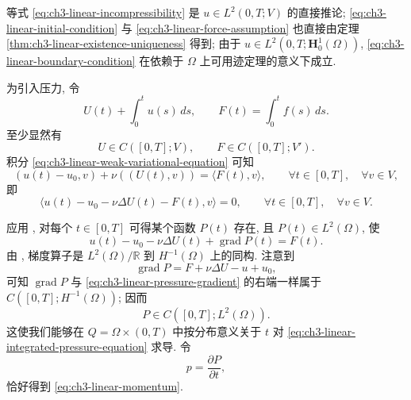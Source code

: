 \begin{Proof}
等式 \eqref{eq:ch3-linear-incompressibility} 是 $u\in L^2(0,T;V)$ 的直接推论; \eqref{eq:ch3-linear-initial-condition} 与 \eqref{eq:ch3-linear-force-assumption} 也直接由定理 \ref{thm:ch3-linear-existence-uniqueness} 得到; 由于 $u\in L^2(0,T;\mathbf H_0^1(\Omega))$, \eqref{eq:ch3-linear-boundary-condition} 在依赖于 $\Omega$ 上可用迹定理的意义下成立.

为引入压力, 令
\begin{equation}
U(t)+\int_0^t u(s)\,ds,
\qquad
F(t)=\int_0^t f(s)\,ds.
\label{eq:ch3-linear-integrated-velocity-force}
\end{equation}
至少显然有
\[
U\in C([0,T];V),
\qquad F\in C([0,T];V').
\]
积分 \eqref{eq:ch3-linear-weak-variational-equation} 可知
\begin{equation}
(u(t)-u_0,v)+\nu((U(t),v))
=\langle F(t),v\rangle,
\qquad\forall t\in[0,T],\quad\forall v\in V,
\label{eq:ch3-linear-integrated-variational-equation}
\end{equation}
即
\[
\langle u(t)-u_0-\nu\Delta U(t)-F(t),v\rangle=0,
\qquad\forall t\in[0,T],\quad\forall v\in V.
\]

\hypertarget{chapter-03-page-196}{}
应用 , 对每个 $t\in[0,T]$ 可得某个函数 $P(t)$ 存在, 且 $P(t)\in L^2(\Omega)$, 使
\begin{equation}
u(t)-u_0-\nu\Delta U(t)+\operatorname{grad}P(t)=F(t).
\label{eq:ch3-linear-integrated-pressure-equation}
\end{equation}
由 , 梯度算子是 $L^2(\Omega)/\mathbb R$ 到 $H^{-1}(\Omega)$ 上的同构. 注意到
\begin{equation}
\operatorname{grad}P=F+\nu\Delta U-u+u_0,
\label{eq:ch3-linear-pressure-gradient}
\end{equation}
可知 $\operatorname{grad}P$ 与 \eqref{eq:ch3-linear-pressure-gradient} 的右端一样属于 $C([0,T];H^{-1}(\Omega))$; 因而
\begin{equation}
P\in C([0,T];L^2(\Omega)).
\label{eq:ch3-linear-integrated-pressure-continuity}
\end{equation}
这使我们能够在 $Q=\Omega\times(0,T)$ 中按分布意义关于 $t$ 对 \eqref{eq:ch3-linear-integrated-pressure-equation} 求导. 令
\begin{equation}
p=\frac{\partial P}{\partial t},
\label{eq:ch3-linear-pressure-time-derivative}
\end{equation}
恰好得到 \eqref{eq:ch3-linear-momentum}.
\end{Proof}

